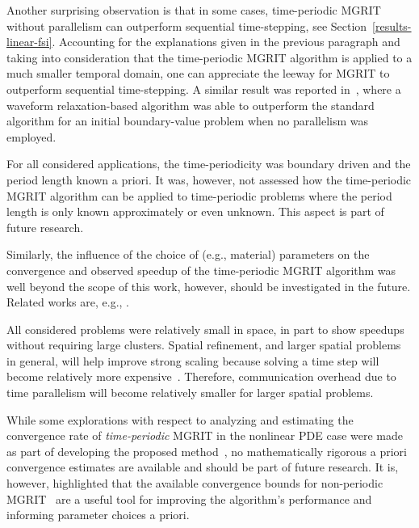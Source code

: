 \documentclass[3p]{elsarticle}
\begin{document}
Another surprising observation is that in some cases,
time-periodic MGRIT without parallelism can outperform sequential time-stepping,
see Section~\ref{results-linear-fsi}.
Accounting for the explanations given in the previous paragraph
and taking into consideration that the time-periodic MGRIT algorithm
is applied to a much smaller temporal domain, one can appreciate
the leeway for MGRIT to outperform sequential time-stepping.
A similar result was reported in~\cite{VandewallePiessens1992},
where a waveform relaxation-based algorithm was able to outperform
the standard algorithm for an initial boundary-value problem
when no parallelism was employed.

For all considered applications, the time-periodicity was boundary driven
and the period length known a priori.
It was, however, not assessed how the time-periodic MGRIT algorithm can be applied
to time-periodic problems where the period length is only known approximately or even unknown.
This aspect is part of future research.

Similarly, the influence of the choice of (e.g., material) parameters on the convergence
and observed speedup of the time-periodic MGRIT algorithm was well beyond the scope of this work,
however, should be investigated in the future.
Related works are, e.g., \cite{SteinerRuprechtSpeckKrause2015,Gander2017,GanderLunet2018}.

All considered problems were relatively small in space,
in part to show speedups without requiring large clusters.
Spatial refinement, and larger spatial problems in general,
will help improve strong scaling
because solving a time step will become
relatively more expensive~\cite{HessenthalerNordslettenRoehrleSchroderFalgout2018}.
Therefore, communication overhead due to time parallelism
will become relatively smaller for larger spatial problems.


While some explorations with respect to analyzing and estimating the convergence rate
of \emph{time-periodic} MGRIT in the nonlinear PDE case were made
as part of developing the proposed method~\cite{Hessenthaler2020_PhD},
no mathematically rigorous a priori convergence estimates are available
and should be part of future research.
It is, however, highlighted that the available convergence bounds
for non-periodic MGRIT~\cite{DobrevKolevPeterssonSchroder2017,Southworth2019,
HessenthalerSouthworthNordslettenRoehrleFalgoutSchroder2020,SouthworthMitchellHessenthalerDanieli}
are a useful tool for improving the algorithm's performance and informing parameter choices a priori.
\end{document}

